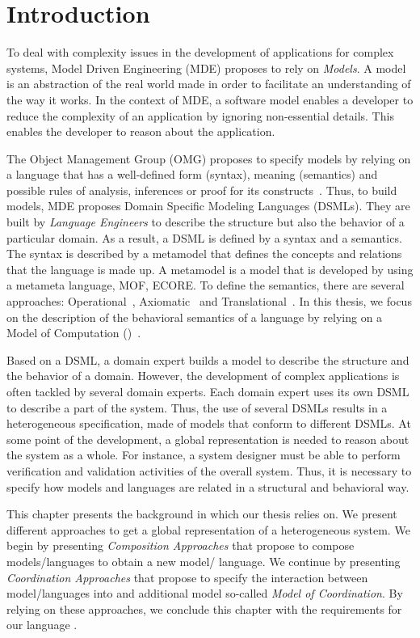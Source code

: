 \section{Introduction}
To deal with complexity issues in the development of applications for complex systems, Model Driven Engineering (MDE) proposes to rely on \emph{Models}. A model is an abstraction of the real world made in order to facilitate an understanding of the way it works. In the context of MDE, a software model enables a developer to reduce the complexity of an application by ignoring non-essential details. This enables the developer to reason about the application. 

The Object Management Group (OMG) proposes to specify models by relying on a language that has a well-defined form (syntax), meaning (semantics) and possible rules of analysis, inferences or proof for its constructs~\cite{mdaguide}. Thus, to build models, MDE proposes Domain Specific Modeling Languages (DSMLs). They are built by \emph{Language Engineers} to describe the structure but also the behavior of a particular domain. As a result, a DSML is defined by a syntax and a semantics. The syntax is described by a metamodel that defines the concepts and relations that the language is made up. A metamodel is a model that is developed by using a metameta language, \eg MOF, ECORE. To define the semantics, there are several approaches: Operational~\cite{operationbib}, Axiomatic~\cite{axiomaticbib} and Translational~\cite{translationalbib}. In this thesis, we focus on the description of the behavioral semantics of a language by relying on a Model of Computation (\mocc)~\cite{moccsemanticbib}. 

Based on a DSML, a domain expert builds a model to describe the structure and the behavior of a domain. However, the development of complex applications is often tackled by several domain experts. Each domain expert uses its own DSML to describe a part of the system. Thus, the use of several DSMLs results in a heterogeneous specification, \ie made of models that conform to different DSMLs. At some point of the development, a global representation is needed to reason about the system as a whole. For instance, a system designer must be able to perform verification and validation activities of the overall system. Thus, it is necessary to specify how models and languages are related in a structural and behavioral way. 

This chapter presents the background in which our thesis relies on. We present different approaches to get a global representation of a heterogeneous system. We begin by presenting \emph{Composition Approaches} that propose to compose models/languages to obtain a new model/ language. We continue by presenting \emph{Coordination Approaches} that propose to specify the interaction between model/languages into and additional model so-called \emph{Model of Coordination}. By relying on these approaches, we conclude this chapter with the requirements for our language \bcool.  

